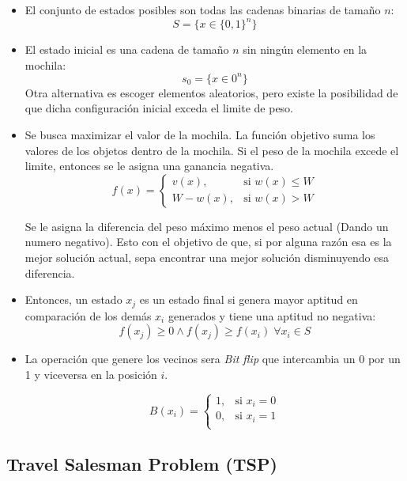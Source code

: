 \documentclass[12pt,twoside]{article}
\begin{document}
	\begin{itemize}
		\item El conjunto de estados posibles son todas las cadenas binarias de tamaño $n$: \[ S = \{ x \in \{ 0, 1  \}^n \} \]
		
		\item El estado inicial es una cadena de tamaño $n$ sin ningún elemento en la mochila: \[ s_0 = \{x \in {0}^n \} \]
		Otra alternativa es escoger elementos aleatorios, pero existe la posibilidad de que dicha configuración inicial exceda el limite de peso.
		
		\item Se busca maximizar el valor de la mochila. La función objetivo suma los valores de los objetos dentro de la mochila. Si el peso de la mochila excede el limite, entonces se le asigna una ganancia negativa. 
		\[
		f(x) =
		\begin{cases} 
			v(x), & \text{si } w(x) \leq W \\ 
			W - w(x), & \text{si } w(x) > W
		\end{cases}
		\]
		
		Se le asigna la diferencia del peso máximo menos el peso actual (Dando un numero negativo). Esto con el objetivo de que, si por alguna razón esa es la mejor solución actual, sepa encontrar una mejor solución disminuyendo esa diferencia.
		
		\item Entonces, un estado $x_j$ es un estado final si genera mayor aptitud en comparación de los demás $x_i$ generados y tiene una aptitud no negativa: \[ f(x_j) \geq 0 \land f(x_j) \geq f(x_i) \; \forall x_i \in S\]
		
		\item La operación que genere los vecinos sera \textit{Bit flip} que intercambia un 0 por un 1 y viceversa en la posición $i$.
		
		\[
		B(x_i) =
		\begin{cases} 
			1, & \text{si } x_i = 0 \\ 
			0, & \text{si } x_i = 1 \\
		\end{cases}
		\]
		
		
	\end{itemize}
	
	\subsection{Travel Salesman Problem (TSP)}
	
\end{document}
